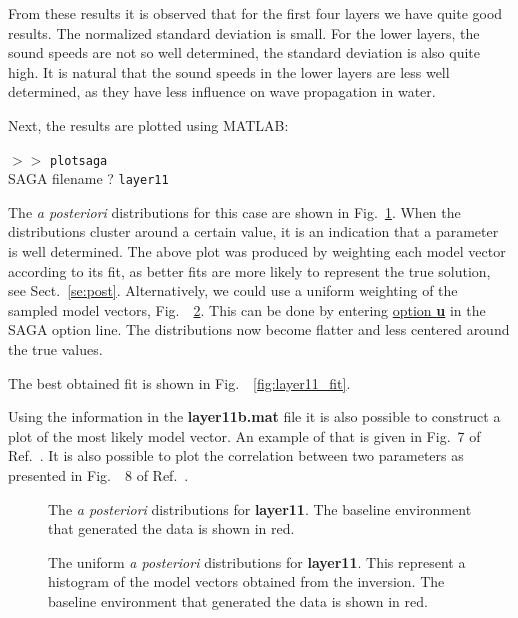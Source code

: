\documentclass{saclantc}
\begin{document}
From these results it is observed that for the first four layers we have 
quite good results. The normalized standard deviation is small.
For the lower layers, the sound speeds are not so well
determined, the standard deviation
is also quite high. It is natural that the sound speeds in the lower
layers are less well determined, as they have less influence on wave
propagation in water.

Next, the results are plotted using MATLAB:

$>>$ {\tt plotsaga}\\
SAGA filename ? {\tt layer11} 

The {\it a posteriori} distributions for this case are shown in Fig.\
\ref{fig:layer11_ppd}. When the distributions cluster around a
certain value, it is an indication that a parameter is well determined.
The above plot was produced by weighting each model vector according
to its fit, as better fits are more likely to represent the true
solution, see Sect.\ \ref{se:post}.
Alternatively, we could use a uniform weighting of the sampled model
vectors, Fig.~\ \ref{fig:layer11_uni}. This can be done by entering
\underline{option {\bf u}} in the {\sf SAGA} option line. The
distributions now become  flatter and less centered around the
true values. 
%

The best obtained fit is shown in Fig.~\ \ref{fig:layer11_fit}.

Using the information in the {\bf layer11b.mat} file it is also
possible to construct a plot of the most likely model vector. An
example of that is given in Fig.\ 7 of Ref.\ \cite{gerstoft:asa94}. It
is also possible to plot the correlation between two parameters as
presented in Fig.~\ 8 of Ref.\ \cite{gerstoft:asa94}. 

\begin{figure}
\epsfxsize=12cm
\centerline{}
\caption{The {\it a posteriori} distributions for {\bf layer11}.
The baseline environment that generated the data is shown in red. }
\label{fig:layer11_ppd}
\end{figure}

\begin{figure}
\epsfxsize=12cm
\centerline{}
\caption{The uniform {\it a posteriori} distributions for {\bf layer11}.
This represent a histogram of the model vectors obtained from the inversion.
The baseline environment that generated the data is shown in red. }
\label{fig:layer11_uni}
\end{figure}
\end{document}
